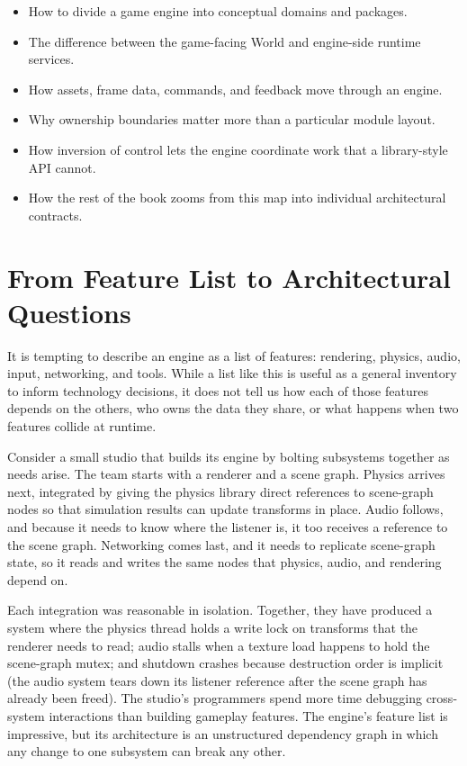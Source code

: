 \documentclass[
  11pt,
  letterpaper,
  DIV=11,
  numbers=noendperiod,
  twoside,
  open=right]{scrreprt}
\providecommand{\tightlist}{%
  \setlength{\itemsep}{0pt}\setlength{\parskip}{0pt}}
\begin{document}

\begin{itemize}
\tightlist
\item
  How to divide a game engine into conceptual domains and packages.
\item
  The difference between the game-facing World and engine-side runtime
  services.
\item
  How assets, frame data, commands, and feedback move through an engine.
\item
  Why ownership boundaries matter more than a particular module layout.
\item
  How inversion of control lets the engine coordinate work that a
  library-style API cannot.
\item
  How the rest of the book zooms from this map into individual
  architectural contracts.
\end{itemize}

\section{From Feature List to Architectural
Questions}\label{from-feature-list-to-architectural-questions}

It is tempting to describe an engine as a list of features: rendering,
physics, audio, input, networking, and tools. While a list like this is
useful as a general inventory to inform technology decisions, it does
not tell us how each of those features depends on the others, who owns
the data they share, or what happens when two features collide at
runtime.

Consider a small studio that builds its engine by bolting subsystems
together as needs arise. The team starts with a renderer and a scene
graph. Physics arrives next, integrated by giving the physics library
direct references to scene-graph nodes so that simulation results can
update transforms in place. Audio follows, and because it needs to know
where the listener is, it too receives a reference to the scene graph.
Networking comes last, and it needs to replicate scene-graph state, so
it reads and writes the same nodes that physics, audio, and rendering
depend on.

Each integration was reasonable in isolation. Together, they have
produced a system where the physics thread holds a write lock on
transforms that the renderer needs to read; audio stalls when a texture
load happens to hold the scene-graph mutex; and shutdown crashes because
destruction order is implicit (the audio system tears down its listener
reference after the scene graph has already been freed). The studio's
programmers spend more time debugging cross-system interactions than
building gameplay features. The engine's feature list is impressive, but
its architecture is an unstructured dependency graph in which any change
to one subsystem can break any other.
\end{document}
